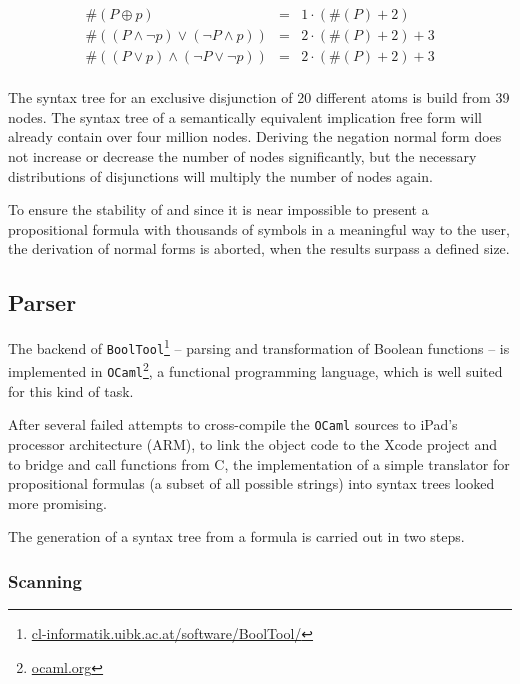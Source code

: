 \begin{eqnarray*}
\#(P \oplus p) & = & 1 \cdot(\#(P) + 2) \\
\#((P \wedge \neg p) \vee  (\neg P \wedge p)) & = & 2 \cdot (\#(P) + 2) + 3 \\
\#((P \vee p) \wedge  (\neg P \vee \neg p)) & = & 2 \cdot (\#(P) + 2) + 3 \\
\end{eqnarray*}

The syntax tree for an exclusive disjunction of 20 different atoms is build from 39 nodes.
The syntax tree of a semantically equivalent implication free form will already contain over four million nodes.
Deriving the negation normal form does not increase or decrease the number of nodes significantly,
but the necessary distributions of disjunctions will multiply the number of nodes again.

To ensure the stability of \Nyaya 
and since it is near impossible 
to present a propositional formula 
with thousands of symbols 
in a meaningful way
to the user, 
the derivation of normal forms is aborted, when the results surpass a defined size.



\subsection{Parser}
\label{sec:Parser}

The backend of \verb+BoolTool+\footnote{
\href{http://cl-informatik.uibk.ac.at/software/BoolTool/}{cl-informatik.uibk.ac.at/software/BoolTool/}} 
– parsing and transformation of Boolean functions – 
is implemented in \verb+OCaml+\footnote{
\href{http://ocaml.org}{ocaml.org}}, 
a functional programming language, which is well suited for this kind of task.

After several failed attempts to cross-compile the \verb+OCaml+ sources to iPad's processor architecture (ARM),
to link the object code to the Xcode project and to bridge and call functions from C, 
the implementation of a simple translator 
for propositional formulas (a subset of all possible strings)
into syntax trees looked more promising. 

The generation of a syntax tree from a formula  is carried out in two steps. 

\subsubsection{Scanning}

